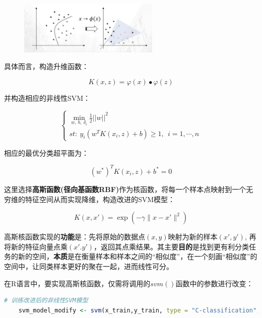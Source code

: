 \documentclass[12pt]{article}  %
\begin{document}
\begin{figure}[H]
	\centering
	\includegraphics[width=0.6\textwidth]{11.png}
\end{figure}

具体而言，构造升维函数：

\begin{equation}
	K(x,z)=\varphi(x)\bullet\varphi(z)                              
\end{equation}

并构造相应的非线性SVM： 

\begin{equation}
	\begin{cases}
		\mathop{min}\limits_{w,\ b,\ \delta_i} {{\frac{1}{2}||w||}^2}         \\                                           
		st:\ y_i(w^TK(x_i,z)+b)\geq1,\ \ i=1,\cdots,n
	\end{cases}                               
\end{equation}

相应的最优分类超平面为：

\begin{equation}
	{(w^\ast)}^TK(x_i,z)+b^\ast=0
\end{equation}

这里选择\textbf{高斯函数(径向基函数RBF)}作为核函数，将每一个样本点映射到一个无穷维的特征空间从而实现降维，构造改进的SVM模型：

\begin{equation}
	K(x, x') = \exp\left(-\gamma \| x - x' \|^2\right)
\end{equation}

高斯核函数实现的\textbf{功能}是：先将原始的数据点$(x, y)$映射为新的样本$(x',y')$, 再将新的特征向量点乘$(x' . y')$，返回其点乘结果。其主要\textbf{目的}是找到更有利分类任务的新的空间，\textbf{本质}是在衡量样本和样本之间的“相似度”，在一个刻画“相似度”的空间中，让同类样本更好的聚在一起，进而线性可分。

在R语言中，要实现高斯核函数，仅需将调用的$svm()$函数中的参数进行改变：

\begin{lstlisting}[language=R]
	# 训练改进后的非线性SVM模型
	svm_model_modify <- svm(x_train,y_train, type = "C-classification", kernel = "radial", gamma = 2, cost = 1, scale = FALSE)
\end{lstlisting}
\end{document}
